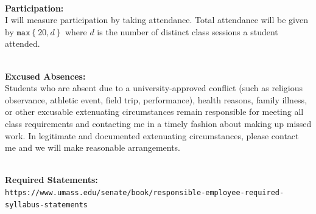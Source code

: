 \documentclass{article}
\begin{document}
\vspace{2mm} \\
\noindent \textbf{Participation:} \\
I will measure participation by taking attendance. Total attendance will be given by $\texttt{max}\left\{20,  d\right\}$ where $d$ is the number of distinct class sessions a student attended. 

\vspace{2mm} \\
\noindent \textbf{Excused Absences:} \\ 
Students who are absent due to a university-approved conflict (such as religious observance, athletic event, field trip, performance), health reasons, family illness, or other excusable extenuating circumstances remain responsible for meeting all class requirements and contacting me in a timely fashion about making up missed work. In legitimate and documented extenuating circumstances, please contact me and we will make reasonable arrangements. 


\vspace{2mm} \\
\noindent \textbf{Required Statements:} \\ 
{\tt https://www.umass.edu/senate/book/responsible-employee-required-syllabus-statements}
\end{document}
